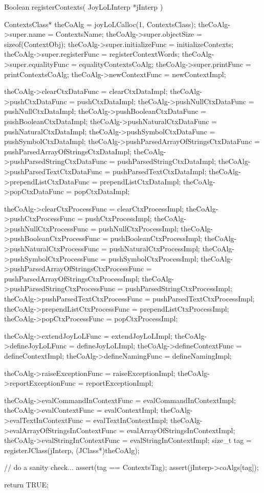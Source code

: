 \startCCode
Boolean registerContexts(
  JoyLoLInterp *jInterp
) {
  ContextsClass* theCoAlg    = 
    joyLoLCalloc(1, ContextsClass);
  theCoAlg->super.name             = ContextsName;
  theCoAlg->super.objectSize       = sizeof(ContextObj);
  theCoAlg->super.initializeFunc   = initializeContexts;
  theCoAlg->super.registerFunc     = registerContextWords;
  theCoAlg->super.equalityFunc     = equalityContextsCoAlg;
  theCoAlg->super.printFunc        = printContextsCoAlg;
  theCoAlg->newContextFunc         = newContextImpl;
  
  theCoAlg->clearCtxDataFunc       = clearCtxDataImpl;
  theCoAlg->pushCtxDataFunc        = pushCtxDataImpl;
  theCoAlg->pushNullCtxDataFunc    = pushNullCtxDataImpl;
  theCoAlg->pushBooleanCtxDataFunc = pushBooleanCtxDataImpl;
  theCoAlg->pushNaturalCtxDataFunc = pushNaturalCtxDataImpl;
  theCoAlg->pushSymbolCtxDataFunc  = pushSymbolCtxDataImpl;
  theCoAlg->pushParsedArrayOfStringsCtxDataFunc =
    pushParsedArrayOfStringsCtxDataImpl;
  theCoAlg->pushParsedStringCtxDataFunc =
    pushParsedStringCtxDataImpl;
  theCoAlg->pushParsedTextCtxDataFunc =
    pushParsedTextCtxDataImpl;
  theCoAlg->prependListCtxDataFunc = prependListCtxDataImpl;
  theCoAlg->popCtxDataFunc         = popCtxDataImpl;
  
  theCoAlg->clearCtxProcessFunc    = clearCtxProcessImpl;
  theCoAlg->pushCtxProcessFunc     = pushCtxProcessImpl;
  theCoAlg->pushNullCtxProcessFunc = pushNullCtxProcessImpl;
  theCoAlg->pushBooleanCtxProcessFunc =
    pushBooleanCtxProcessImpl;
  theCoAlg->pushNaturalCtxProcessFunc =
    pushNaturalCtxProcessImpl;
  theCoAlg->pushSymbolCtxProcessFunc =
    pushSymbolCtxProcessImpl;
  theCoAlg->pushParsedArrayOfStringsCtxProcessFunc =
    pushParsedArrayOfStringsCtxProcessImpl;
  theCoAlg->pushParsedStringCtxProcessFunc =
    pushParsedStringCtxProcessImpl;
  theCoAlg->pushParsedTextCtxProcessFunc =
    pushParsedTextCtxProcessImpl;
  theCoAlg->prependListCtxProcessFunc =
    prependListCtxProcessImpl;
  theCoAlg->popCtxProcessFunc      = popCtxProcessImpl;
  
  theCoAlg->extendJoyLoLFunc       = extendJoyLoLImpl;
  theCoAlg->defineJoyLoLFunc       = defineJoyLoLImpl;
  theCoAlg->defineContextFunc      = defineContextImpl;
  theCoAlg->defineNamingFunc       = defineNamingImpl;

  theCoAlg->raiseExceptionFunc     = raiseExceptionImpl;
  theCoAlg->reportExceptionFunc    = reportExceptionImpl;
  
  theCoAlg->evalCommandInContextFunc =
    evalCommandInContextImpl;
  theCoAlg->evalContextFunc        = evalContextImpl;
  theCoAlg->evalTextInContextFunc  = evalTextInContextImpl;
  theCoAlg->evalArrayOfStringsInContextFunc =
    evalArrayOfStringsInContextImpl;
  theCoAlg->evalStringInContextFunc =
    evalStringInContextImpl;
  size_t tag =
    registerJClass(jInterp, (JClass*)theCoAlg);

  // do a sanity check...
  assert(tag == ContextsTag);
  assert(jInterp->coAlgs[tag]);

  return TRUE;
}
\stopCCode

